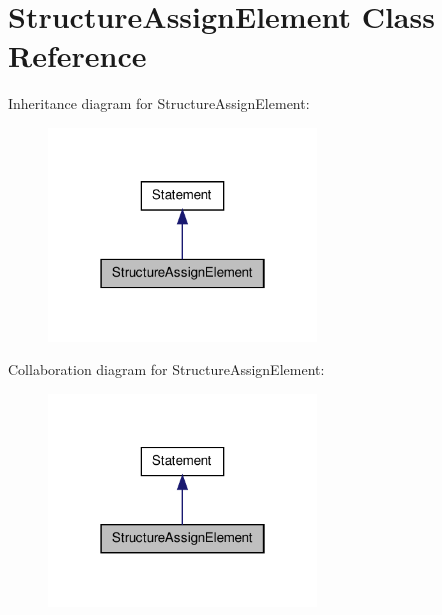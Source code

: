 \hypertarget{class_structure_assign_element}{\section{Structure\-Assign\-Element Class Reference}
\label{class_structure_assign_element}
}


Inheritance diagram for Structure\-Assign\-Element\-:
\nopagebreak
\begin{figure}[H]
\begin{center}
\leavevmode
\includegraphics[width=202pt]{class_structure_assign_element__inherit__graph}
\end{center}
\end{figure}


Collaboration diagram for Structure\-Assign\-Element\-:
\nopagebreak
\begin{figure}[H]
\begin{center}
\leavevmode
\includegraphics[width=202pt]{class_structure_assign_element__coll__graph}
\end{center}
\end{figure}
